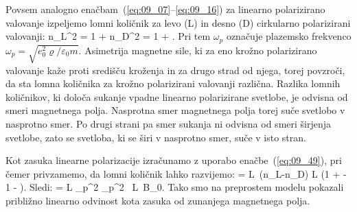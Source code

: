 \label{eq:09_65}
\eeq
Povsem analogno enačbam~(\ref{eq:09_07}--\ref{eq:09_16}) za linearno polarizirano 
valovanje izpeljemo lomni količnik za levo (L) in desno (D) cirkularno polarizirani valovanji:
\beq
n_L^2 = 1 +  \qquad {}
\qquad 
n_D^2 = 1 + .
\label{eq:09_66}
\eeq
Pri tem $\omega_p$ označuje plazemsko frekvenco $\omega_p = \sqrt{e_0^2 \varrho/\varepsilon_0 m}$. 
Asimetrija magnetne sile, ki za eno krožno polarizirano valovanje kaže proti
središču kroženja in za drugo strad od njega, torej povzroči, da sta lomna količnika
za krožno polarizirani valovanji različna. 
Razlika lomnih količnikov, ki določa sukanje vpadne linearno polarizirane svetlobe,
je odvisna od smeri magnetnega polja. Nasprotna smer magnetnega polja torej suče svetlobo
v nasprotno smer. Po drugi strani pa smer sukanja ni odvisna od smeri širjenja svetlobe, 
zato se svetloba, ki se širi v nasprotno smer, suče v isto stran.

Kot zasuka linearne polarizacije izračunamo z uporabo enačbe~(\ref{eq:09_49}), pri čemer
privzamemo, da lomni količnik lahko razvijemo:
\beq
\Delta \varphi = \frac{\pi}{\lambda} L~(n_L-n_D) \approx \frac{\pi}{\lambda} L
\left(1 + - 
1 - \right).
\eeq
Sledi:
\beq
\Delta \varphi = \frac{\pi}{\lambda} L \omega_p^2
\approx \frac{\pi}{\lambda} \omega_p^2 ~L~B_0.
\eeq
Tako smo na preprostem modelu pokazali približno linearno odvinost kota zasuka od zunanjega 
magnetnega polja. 

